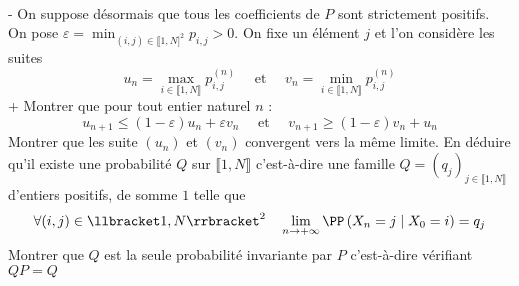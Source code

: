 \begin{exercise}[title=Chaînes de Markov]
\begin{equation*}
\begin{aligned}
\end{aligned}
\end{equation*}
\question- On suppose désormais que tous les coefficients de $P$ sont strictement positifs. $\mathrm{On}$ pose $\varepsilon=\min _{(i, j) \in \llbracket 1, N]^{2}} p_{i, j}>0$. On fixe un élément $j$ et l'on considère les suites
\begin{equation*}
u_{n}=\max _{i \in \llbracket 1, N \rrbracket} p_{i, j}^{(n)} \quad \text { et } \quad v_{n}=\min _{i \in \llbracket 1, N \rrbracket} p_{i, j}^{(n)}
\end{equation*}
\question+ Montrer que pour tout entier naturel $n$ :
\begin{equation*}
u_{n+1} \leqslant(1-\varepsilon) u_{n}+\varepsilon v_{n} \quad \text { et } \quad v_{n+1} \geqslant(1-\varepsilon) v_{n}+u_{n}
\end{equation*}
\question Montrer que les suite $\left(u_{n}\right)$ et $\left(v_{n}\right)$ convergent vers la même limite.
\question En déduire qu'il existe une probabilité $Q$ sur $\llbracket 1, N \rrbracket$ c'est-à-dire une famille $Q=\left(q_{j}\right)_{j \in \llbracket 1, N \rrbracket}$ d'entiers positifs, de somme $1$ telle que
\begin{equation*}
\forall(i, j) \in \llbracket 1, N \rrbracket^{2} \quad \lim _{n \rightarrow+\infty} \PP\left(X_{n}=j \mid X_{0}=i\right)=q_{j}
\end{equation*}
Montrer que $Q$ est la seule probabilité invariante par $P$ c'est-à-dire vérifiant $Q P=Q$
\endquestions 
\end{exercise}


